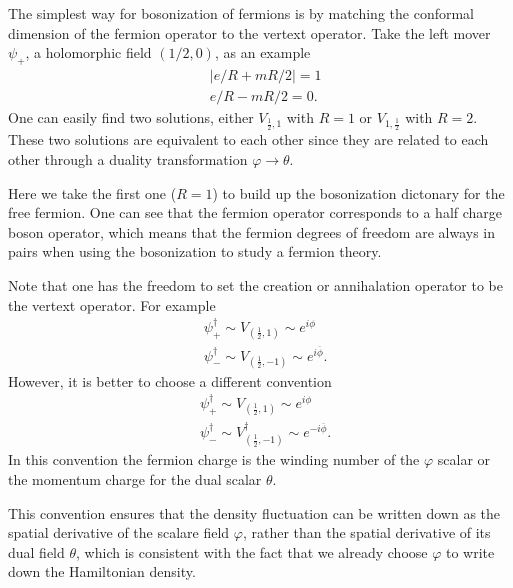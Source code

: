 The simplest way for bosonization of fermions is by matching the conformal dimension of the fermion operator to the vertext operator. Take the left mover $\psi_{+}$, a holomorphic field $\left(1/2,0\right)$, as an example
\begin{equation}
	\begin{aligned}
		&\left\vert e/R + mR/2 \right\vert = 1\\
		&e/R - mR/2 = 0.
	\end{aligned}
\end{equation}
One can easily find two solutions, either $V_{\frac{1}{2},1}$ with $R=1$ or $V_{1,\frac{1}{2}}$ with $R=2$. These two solutions are equivalent to each other since they are related to each other through a duality transformation $\varphi \rightarrow \theta$. 

Here we take the first one ($R=1$) to build up the bosonization dictonary for the free fermion. One can see that the fermion operator corresponds to a half charge boson operator, which means that the fermion degrees of freedom are always in pairs when using the bosonization to study a fermion theory.

Note that one has the freedom to set the creation or annihalation operator to be the vertext operator. For example
\begin{equation}
	\begin{aligned}
		&\psi^{\dagger}_{+} \sim V_{(\frac{1}{2},1)} \sim e^{i \phi} \\
		&{\psi}^{\dagger}_{-} \sim V_{(\frac{1}{2},-1)} \sim e^{i\overline{\phi}}.
	\end{aligned}
\end{equation}
However, it is better to choose a different convention
\begin{equation}
	\begin{aligned}
		&\psi^{\dagger}_{+} \sim V_{(\frac{1}{2},1)} \sim e^{i \phi} \\
		&{\psi}^{\dagger}_{-} \sim V_{(\frac{1}{2},-1)}^\dagger \sim e^{-i\overline{\phi}}.
	\end{aligned}
\end{equation}
In this convention the fermion charge is the winding number of the $\varphi$ scalar or the momentum charge for the dual scalar $\theta$.

This convention ensures that the density fluctuation can be written down as the spatial derivative of the scalare field $\varphi$, rather than the spatial derivative of its dual field $\theta$, which is consistent with the fact that we already choose $\varphi$ to write down the Hamiltonian density.\\


